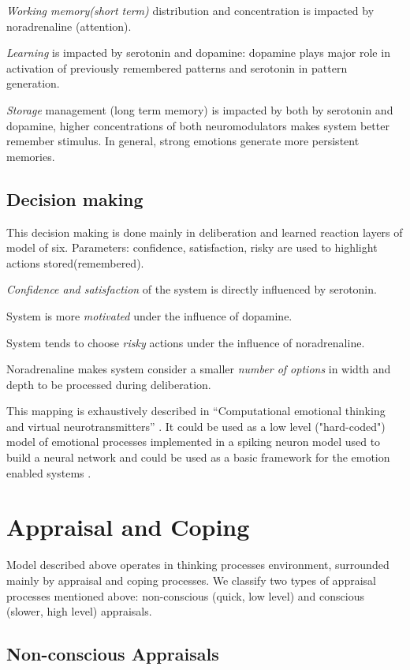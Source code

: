 \emph{Working memory(short term)} distribution and concentration is impacted by noradrenaline (attention).

\emph{Learning} is impacted by serotonin and dopamine: dopamine plays major role in activation of previously remembered patterns and serotonin in pattern generation.

\emph{Storage} management (long term memory) is impacted by both by serotonin and dopamine, higher concentrations of both neuromodulators makes system better remember stimulus. In general, strong emotions generate more persistent memories.

\subsection{Decision making}

This decision making is done mainly in deliberation and learned reaction layers of model of six.
Parameters: confidence, satisfaction, risky are used to highlight actions stored(remembered).

\emph{Confidence and satisfaction} of the system is directly influenced by serotonin.

System is more \emph{motivated} under the influence of dopamine.

System tends to choose \emph{risky} actions under the influence of noradrenaline.

Noradrenaline makes system consider a smaller \emph{number of options} in width and depth to be processed during deliberation.

This mapping is exhaustively described in ``Computational emotional thinking and virtual neurotransmitters'' \cite{computational_emotional_thinking}. It could be used as a low level ("hard-coded") model of emotional processes implemented in a spiking neuron model used to build a neural network and could be used as a basic framework for the emotion enabled systems \cite{whatdoesitmeanforcomputer}.

\section{Appraisal and Coping}

Model described above operates in thinking processes environment, surrounded mainly by appraisal and coping processes. We classify two types of appraisal processes mentioned above: non-conscious (quick, low level) and conscious (slower, high level) appraisals.

\subsection{Non-conscious Appraisals}

